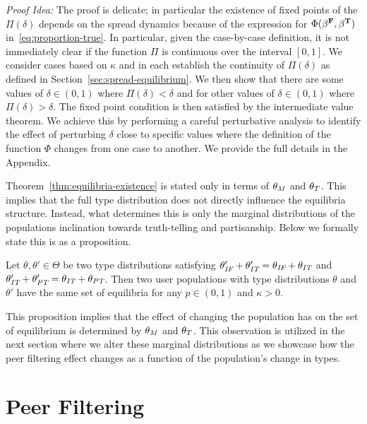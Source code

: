 \textit{Proof Idea:} The proof is delicate; in particular the existence of fixed points of the $\Pi(\delta)$ depends on the spread dynamics because of the expression for $\Phi(\beta^\false, \beta^\true)$ in~\eqref{eq:proportion-true}.  In particular, given the case-by-case definition, it is not immediately clear if the function $\Pi$ is continuous over the interval $[0,1]$. We consider cases based on $\kappa$ and in each establish the  continuity of $\Pi(\delta)$ as defined in Section~\ref{sec:spread-equilibrium}. We then show that there are some values of $\delta \in (0, 1) $ where $\Pi(\delta) < \delta$ and for other values of $\delta \in (0, 1) $ where $\Pi(\delta) > \delta$. The fixed point condition is then satisfied by the intermediate value theorem. We achieve this by performing a careful perturbative analysis to identify the effect of perturbing $\delta$ close to specific values where the definition of the function $\Phi$ changes from one case to another. We provide the full details in the Appendix.

Theorem~\ref{thm:equilibria-existence} is stated only in terms of $\tm$ and $\tt$. This implies that the full type distribution does not directly influence the equilibria structure. Instead, what determines this is only the marginal distributions of the populations inclination towards truth-telling and partisanship.  Below we formally state this is as a proposition. 

\begin{proposition}
     Let $\theta, \theta' \in \Theta$ be two type distributions satisfying $\theta_{\IF}' + \theta_{\IT}' = \theta_{\IF} + \theta_{\IT}$  and $\theta_{\IT}' + \theta_{\PT}' = \theta_{\IT} + \theta_{\PT}$. Then two user populations with type distributions $\theta$ and $\theta'$ have the same set of equilibria for any $p \in (0,1)$ and $\kappa > 0 $. 
\end{proposition}

This proposition implies that the effect of changing the population has on the set of equilibrium is determined by $\tm$ and $\tt$. This observation is utilized in the next section where we alter these marginal distributions as we showcase how the peer filtering effect changes as a function of the population's change in types.
\section{Peer Filtering}



